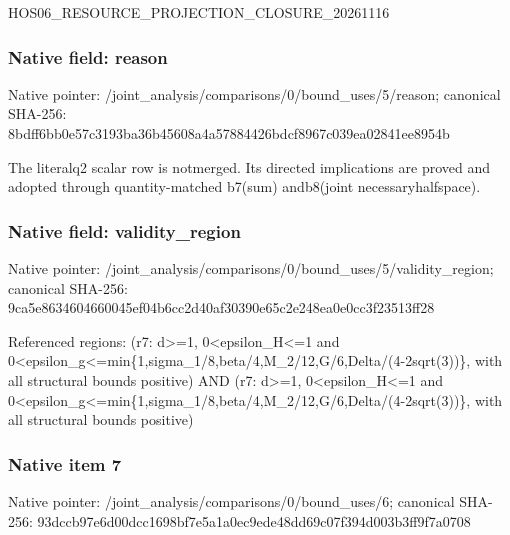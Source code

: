 \documentclass[10pt,a4paper]{article}
\begin{document}
\begingroup\raggedright\sloppy HOS06\_\allowbreak{}RESOURCE\_\allowbreak{}PROJECTION\_\allowbreak{}CLOSURE\_\allowbreak{}20261116\par\endgroup

\subsubsection{Native field: reason}
Native pointer: /joint\_\allowbreak{}analysis/comparisons/0/bound\_\allowbreak{}uses/5/reason; canonical SHA-256: 8bdff6bb0e57c3193ba36b45608a4a57884426bdcf8967c039ea02841ee8954b

\begingroup\raggedright\sloppy The literalq2 scalar row is notmerged. Its directed implications are proved and adopted through quantity-matched b7(sum) andb8(joint necessaryhalfspace).\par\endgroup

\subsubsection{Native field: validity\_\allowbreak{}region}
Native pointer: /joint\_\allowbreak{}analysis/comparisons/0/bound\_\allowbreak{}uses/5/validity\_\allowbreak{}region; canonical SHA-256: 9ca5e8634604660045ef04b6cc2d40af30390e65c2e248ea0e0cc3f23513ff28

\begingroup\raggedright\sloppy Referenced regions:\allowbreak{} (r7:\allowbreak{} d>=\allowbreak{}1,\allowbreak{} 0<epsilon\_\allowbreak{}H<=\allowbreak{}1 and 0<epsilon\_\allowbreak{}g<=\allowbreak{}min\{1,\allowbreak{}sigma\_\allowbreak{}1/\allowbreak{}8,\allowbreak{}beta/\allowbreak{}4,\allowbreak{}M\_\allowbreak{}2/\allowbreak{}12,\allowbreak{}G/\allowbreak{}6,\allowbreak{}Delta/\allowbreak{}(4-2sqrt(3))\},\allowbreak{} with all structural bounds positive) AND (r7:\allowbreak{} d>=\allowbreak{}1,\allowbreak{} 0<epsilon\_\allowbreak{}H<=\allowbreak{}1 and 0<epsilon\_\allowbreak{}g<=\allowbreak{}min\{1,\allowbreak{}sigma\_\allowbreak{}1/\allowbreak{}8,\allowbreak{}beta/\allowbreak{}4,\allowbreak{}M\_\allowbreak{}2/\allowbreak{}12,\allowbreak{}G/\allowbreak{}6,\allowbreak{}Delta/\allowbreak{}(4-2sqrt(3))\},\allowbreak{} with all structural bounds positive)\par\endgroup

\subsubsection{Native item 7}
Native pointer: /joint\_\allowbreak{}analysis/comparisons/0/bound\_\allowbreak{}uses/6; canonical SHA-256: 93dccb97e6d00dcc1698bf7e5a1a0ec9ede48dd69c07f394d003b3ff9f7a0708
\end{document}
